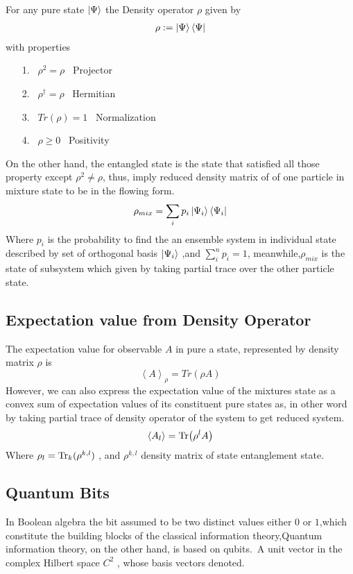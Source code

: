 For any pure state $\ket{\Psi}$ the Density operator $\rho$ given by
\begin{align}
\rho:=\ket{\Psi}\bra{\Psi}
\end{align}
with properties 
\begin{itemize}
\item[1.] ~$\rho^2=\rho$ ~Projector 
\item [2.]~$\rho^\dagger =\rho$ ~Hermitian
\item [3.]~$Tr(\rho)=1$ ~Normalization
\item [4.]~$\rho \geqslant 0$ ~Positivity
\end{itemize}
On the other hand, the entangled state is the state that satisfied all those property except $\rho^2\neq\rho$, thus, imply reduced  density matrix of of one particle in  mixture state to be in the flowing form.
\begin{equation}
\rho_{mix }= \sum_{i} p_i \ket{\Psi_i}\bra{\Psi_i}
\end{equation}
Where $p_i$ is the probability to find the an ensemble system in individual state described by set of orthogonal basis $\ket{\Psi_i} $ ,and $\sum_{i}^n p_i=1$, meanwhile,$\rho_{mix }$ is the state of subsystem which given by taking partial trace over the other particle state.

\subsection{Expectation value from Density Operator}\hfill \break
The expectation value for observable $A$ in pure a state, represented by density matrix $\rho$ is
$$\left<A\right>_\rho=Tr(\rho A)$$
However, we can also express the expectation value of the mixtures state as a convex sum of expectation values of its constituent pure states as, in other word by taking partial trace of density operator of the system to get reduced system. 
$$\left<A_l\right>= \Tr(\rho^l A)$$
Where $\rho_l=\Tr_k(\rho^{k,l})$ , and $\rho^{k,l}$ density matrix of state entanglement state.


\subsection{Quantum Bits}\hfill \break
In Boolean algebra the bit assumed to be two distinct values either $0 $ or $1$,which constitute the building blocks of the classical information theory,Quantum information theory, on the other hand, is based on qubits.\citep{nielsen2002quantum}~A unit vector in the complex Hilbert space $C^2$ , whose basis vectors denoted.

